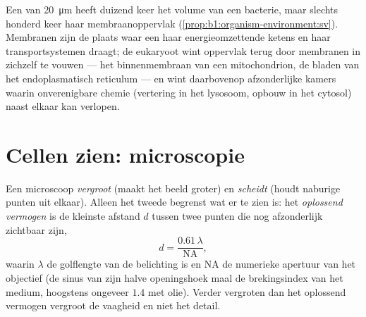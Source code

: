 \begin{example}\label{ex:b1:cell-unit-of-life:whycompart}
Een  van \qty{20}{\micro m} heeft duizend keer het volume van een bacterie,
maar slechts honderd keer haar membraanoppervlak
(\cref{prop:b1:organism-environment:sv}). Membranen zijn de plaats waar een 
haar energieomzettende ketens en haar transportsystemen draagt; de eukaryoot
wint oppervlak terug door membranen in zichzelf te vouwen --- het binnenmembraan
van een mitochondrion, de bladen van het endoplasmatisch reticulum --- en wint
daarbovenop afzonderlijke kamers waarin onverenigbare chemie (vertering in het
lysosoom, opbouw in het cytosol) naast elkaar kan verlopen.
\end{example}

\section{Cellen zien: microscopie}

\begin{definition}\label{def:b1:cell-unit-of-life:resolution}
Een microscoop \emph{vergroot} (maakt het beeld groter) en
\emph{scheidt} (houdt naburige punten uit elkaar). Alleen het
tweede begrenst wat er te zien is: het \emph{oplossend
vermogen} is de kleinste afstand $d$ tussen twee
punten die nog afzonderlijk zichtbaar zijn,
\[
d = \frac{0.61\,\lambda}{\mathrm{NA}},
\]
waarin $\lambda$ de golflengte van de belichting is en $\mathrm{NA}$ de
numerieke apertuur van het objectief (de sinus van zijn halve openingshoek maal
de brekingsindex van het medium, hoogstens ongeveer $1.4$ met olie). Verder
vergroten dan het oplossend vermogen vergroot de vaagheid en niet het detail.
\end{definition}

